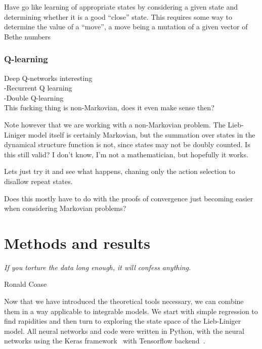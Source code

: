 \documentclass[11pt, a4paper]{report} %
\begin{document}
Have go like learning of appropriate states by considering a given state and determining whether it is a good ``close'' state.
This requires some way to determine the value of a ``move'', a move being a mutation of a given vector of Bethe numbers\cite{Silver2017}

\subsection{Q-learning}

Deep Q-networks interesting\cite{mnih13_playin_atari_with_deep_reinf_learn}\\
-Recurrent Q learning\cite{hausknecht15_deep_recur_q_learn_partial_obser_mdps}\\
-Double Q-learning\cite{hasselt15_deep_reinf_learn_with_doubl_q_learn}\\

This fucking thing is non-Markovian, does it even make sense then?

Note however that we are working with a non-Markovian problem.
The Lieb-Liniger model itself is certainly Markovian, but the summation over states in the dynamical structure function is not, since states may not be doubly counted.
Is this still valid?
I don't know, I'm not a mathematician, but hopefully it works.

Lets just try it and see what happens, chaning only the action selection to disallow repeat states.

Does this mostly have to do with the proofs of convergence just becoming easier when considering Markovian problems?






\chapter{Methods and results}\label{chap:results}

\epigraph{\textit{If you torture the data long enough, it will confess anything.}}{Ronald Coase}

Now that we have introduced the theoretical tools necessary, we can combine them in a way applicable to integrable models.
We start with simple regression to find rapidities and then turn to exploring the state space of the Lieb-Liniger model.
All neural networks and code were written in Python, with the neural networks using the Keras framework~\cite{chollet2015keras} with Tensorflow backend~\cite{tensorflow2015-whitepaper}.
\end{document}
